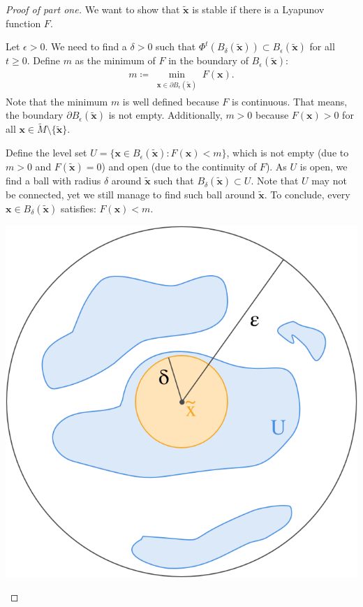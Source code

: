 \documentclass[hidelinks,a4paper, 11pt]{article}
\theoremstyle{plain}
\theoremstyle{break}
\theoremstyle{plain}
\theoremstyle{definition}
\begin{document}
\begin{proof}[Proof of part one]
	We want to show that $\mathbf{\tilde x}$ is stable if there is a Lyapunov function $F$. 
	
	Let $\epsilon > 0$. We need to find a $\delta > 0$ such that $\Phi^t(B_{\delta}(\mathbf{\tilde x})) \subset B_{\epsilon}(\mathbf{\tilde x})$ for all $t \geq 0$. Define $m$ as the minimum of $F$ in the boundary of $B_{\epsilon}(\mathbf{\tilde x})$:
	\begin{align}\label{proof:lyapunov-theorem}
		m \coloneqq \min_{\substack{\mathbf x \in \partial  B_{\epsilon}(\mathbf{\tilde x})}} F(\mathbf x).
	\end{align}
	Note that the minimum $m$ is well defined because $F$ is continuous. That means, the boundary $\partial B_{\epsilon}(\mathbf{\tilde x})$ is not empty. Additionally, $m > 0$ because $F(\mathbf x) > 0$ for all $\mathbf{x} \in \tilde M \setminus \{ \mathbf{\tilde x} \}$. 
	
	Define the level set $U = \{ \mathbf x \in B_{\epsilon}(\mathbf{\tilde x}) : F(\mathbf x) < m \}$, which is not empty (due to $m > 0$ and $F(\mathbf{\tilde x}) = 0$) and open (due to the continuity of $F$). As $U$ is open, we find a ball with radius $\delta$ around $\mathbf{\tilde x}$ such that $B_{\delta}(\mathbf{\tilde x}) \subset U$. Note that $U$ may not be connected, yet we still manage to find such ball around $\mathbf{\tilde x}$. To conclude, every $\mathbf x \in B_{\delta}(\mathbf{\tilde x})$ satisfies: $F(\mathbf x) < m$.
	
	\begin{center}
		\includegraphics[scale=0.25]{lyapunov-theorem.png}
	\end{center}


\end{proof}
\end{document}
